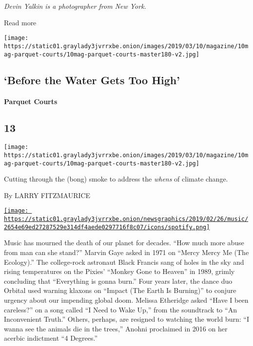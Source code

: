 \emph{Devin Yalkin is a photographer from New York.}

Read more

\texttt{[image: https://static01.graylady3jvrrxbe.onion/images/2019/03/10/magazine/10mag-parquet-courts/10mag-parquet-courts-master180-v2.jpg]}

\hypertarget{--before-the-water-gets-too-high}{%
\subsection{\texorpdfstring{ `Before the Water Gets Too
High'}{  `Before the Water Gets Too High'}}\label{--before-the-water-gets-too-high}}

\hypertarget{parquet-courts}{%
\paragraph{Parquet Courts}\label{parquet-courts}}

\hypertarget{13}{%
\subsection{13}\label{13}}

\texttt{[image: https://static01.graylady3jvrrxbe.onion/images/2019/03/10/magazine/10mag-parquet-courts/10mag-parquet-courts-master180-v2.jpg]}

Cutting through the (bong) smoke to address the \emph{whens} of climate
change.

By LARRY FITZMAURICE

\href{https://open.spotify.com/track/5wpBEy8gYVQmb5VArtayfp}{\texttt{[image: https://static01.graylady3jvrrxbe.onion/newsgraphics/2019/02/26/music/2654e69ed27287529e314df4aede0297716f8c07/icons/spotify.png]}}

Music has mourned the death of our planet for decades. ``How much more
abuse from man can she stand?'' Marvin Gaye asked in 1971 on ``Mercy
Mercy Me (The Ecology).'' The college-rock astronaut Black Francis sang
of holes in the sky and rising temperatures on the Pixies' ``Monkey Gone
to Heaven'' in 1989, grimly concluding that ``Everything is gonna
burn.'' Four years later, the dance duo Orbital used warning klaxons on
``Impact (The Earth Is Burning)'' to conjure urgency about our impending
global doom. Melissa Etheridge asked ``Have I been careless?'' on a song
called ``I Need to Wake Up,'' from the soundtrack to ``An Inconvenient
Truth.'' Others, perhaps, are resigned to watching the world burn: ``I
wanna see the animals die in the trees,'' Anohni proclaimed in 2016 on
her acerbic indictment ``4 Degrees.''

